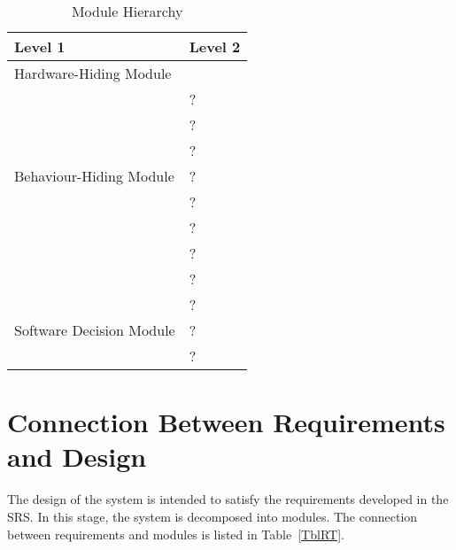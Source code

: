 \documentclass[12pt, titlepage]{article}
\begin{document}
\begin{table}[h!]
	\centering
	\begin{tabular}{p{} p{}}
		\toprule
		\textbf{Level 1}                                      & \textbf{Level 2} \\
		\midrule

		{Hardware-Hiding Module}                              & ~                \\
		\midrule

		\multirow{7}{0.3\textwidth}{Behaviour-Hiding Module}  & ?                \\
		                                                      & ?                \\
		                                                      & ?                \\
		                                                      & ?                \\
		                                                      & ?                \\
		                                                      & ?                \\
		                                                      & ?                \\
		                                                      & ?                \\
		\midrule

		\multirow{3}{0.3\textwidth}{Software Decision Module} & {?}              \\
		                                                      & ?                \\
		                                                      & ?                \\
		\bottomrule

	\end{tabular}
	\caption{Module Hierarchy}
	\label{TblMH}
\end{table}

\section{Connection Between Requirements and Design} \label{SecConnection}

The design of the system is intended to satisfy the requirements developed in the SRS. In this
stage, the system is decomposed into modules. The connection between requirements and modules is
listed in Table~\ref{TblRT}.
\end{document}
